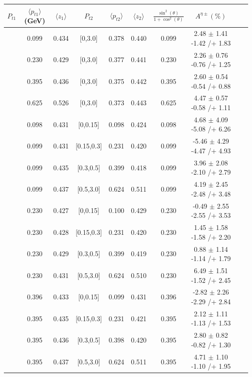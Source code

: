 \begin{table}[H]\scriptsize
\centering
\begin{tabular}{|c| c| c| c| c| c| c| c| c| c|}
\hline
$P_{t1}$   & $\langle  p_{t1} \rangle$(GeV) & $\langle  z_1 \rangle$& $P_{t2}$  & $\langle  p_{t2}\rangle$  &  $\langle  z_2 \rangle$  &$\frac{\sin^2(\theta)}{1+\cos^2(\theta)}$&  $A^{\eta\pm}(\%)$  \\ \hline
[0,0.15]	&	0.099	&	0.434	&	[0,3.0]	&	0.378	&	0.440	&	0.099	&	2.48	$\pm$ 	1.41	-1.42	/+	1.83	\\ \hline
[0.15,0.3]	&	0.230	&	0.429	&	[0,3.0]	&	0.377	&	0.441	&	0.230	&	2.26	$\pm$ 	0.76	-0.76	/+	1.25	\\ \hline
[0.3,0.5]	&	0.395	&	0.436	&	[0,3.0]	&	0.375	&	0.442	&	0.395	&	2.60	$\pm$ 	0.54	-0.54	/+	0.88	\\ \hline
[0.5,3.0]	&	0.625	&	0.526	&	[0,3.0]	&	0.373	&	0.443	&	0.625	&	4.47	$\pm$ 	0.57	-0.58	/+	1.11	\\ \hline
[0,0.15]	&	0.098	&	0.431	&	[0,0.15]	&	0.098	&	0.424	&	0.098	&	4.68	$\pm$ 	4.09	-5.08	/+	6.26	\\ \hline
[0,0.15]	&	0.099	&	0.431	&	[0.15,0.3]	&	0.231	&	0.420	&	0.099	&	-5.46	$\pm$ 	4.29	-4.47	/+	4.93	\\ \hline
[0,0.15]	&	0.099	&	0.435	&	[0.3,0.5]	&	0.399	&	0.418	&	0.099	&	3.96	$\pm$ 	2.08	-2.10	/+	2.79	\\ \hline
[0,0.15]	&	0.099	&	0.437	&	[0.5,3.0]	&	0.624	&	0.511	&	0.099	&	4.19	$\pm$ 	2.45	-2.48	/+	3.48	\\ \hline
[0.15,0.3]	&	0.230	&	0.427	&	[0,0.15]	&	0.100	&	0.429	&	0.230	&	-0.49	$\pm$ 	2.55	-2.55	/+	3.53	\\ \hline
[0.15,0.3]	&	0.230	&	0.428	&	[0.15,0.3]	&	0.231	&	0.420	&	0.230	&	1.45	$\pm$ 	1.58	-1.58	/+	2.20	\\ \hline
[0.15,0.3]	&	0.230	&	0.429	&	[0.3,0.5]	&	0.399	&	0.419	&	0.230	&	0.88	$\pm$ 	1.14	-1.14	/+	1.79	\\ \hline
[0.15,0.3]	&	0.230	&	0.431	&	[0.5,3.0]	&	0.624	&	0.510	&	0.230	&	6.49	$\pm$ 	1.51	-1.52	/+	2.45	\\ \hline
[0.3,0.5]	&	0.396	&	0.433	&	[0,0.15]	&	0.099	&	0.431	&	0.396	&	-2.82	$\pm$ 	2.26	-2.29	/+	2.84	\\ \hline
[0.3,0.5]	&	0.395	&	0.435	&	[0.15,0.3]	&	0.231	&	0.421	&	0.395	&	2.12	$\pm$ 	1.11	-1.13	/+	1.53	\\ \hline
[0.3,0.5]	&	0.395	&	0.436	&	[0.3,0.5]	&	0.398	&	0.420	&	0.395	&	2.80	$\pm$ 	0.82	-0.82	/+	1.30	\\ \hline
[0.3,0.5]	&	0.395	&	0.437	&	[0.5,3.0]	&	0.624	&	0.511	&	0.395	&	4.71	$\pm$ 	1.10	-1.10	/+	1.95	\\ \hline

\end{tabular}
\end{table}
